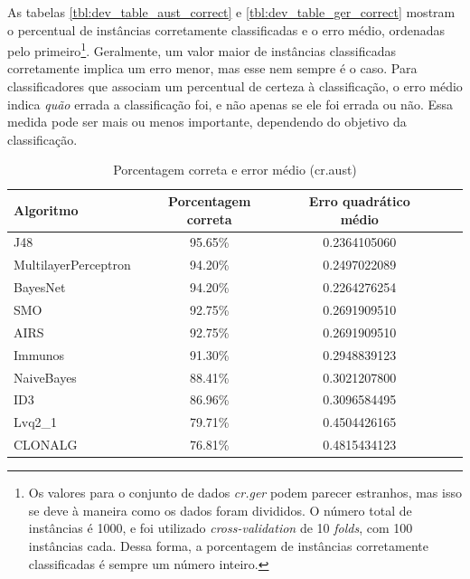 As tabelas \ref{tbl:dev_table_aust_correct} e \ref{tbl:dev_table_ger_correct} mostram o percentual de instâncias corretamente classificadas e o erro médio, ordenadas pelo primeiro\footnote{Os valores para o conjunto de dados \emph{cr.ger} podem parecer estranhos, mas isso se deve à maneira como os dados foram divididos. O número total de instâncias é 1000, e foi utilizado \emph{cross-validation} de 10 \emph{folds}, com 100 instâncias cada. Dessa forma, a porcentagem de instâncias corretamente classificadas é sempre um número inteiro.}. Geralmente, um valor maior de instâncias classificadas corretamente implica um erro menor, mas esse nem sempre é o caso. Para classificadores que associam um percentual de certeza à classificação, o erro médio indica \emph{quão} errada a classificação foi, e não apenas se ele foi errada ou não. Essa medida pode ser mais ou menos importante, dependendo do objetivo da classificação.

\begin{table}[h!]
    \vspace{0.5cm}
    \centering
    \caption{Porcentagem correta e error médio (cr.aust)}
    \label{tbl:dev_table_aust_correct}
    \label{tbl:dev_table_first}
    \vspace{0.5cm}
    \begin{tabular}{|l|c|c|c|c|}
        \hline
        \textbf{Algoritmo} & \textbf{Porcentagem correta} & \textbf{Erro quadrático médio} \\
        \hline
        \rowcolor[gray]{.9}
        J48                  & 95.65\% & 0.2364105060 \\ \hline
        \rowcolor[gray]{.9}
        MultilayerPerceptron & 94.20\% & 0.2497022089 \\ \hline
        \rowcolor[gray]{.9}
        BayesNet             & 94.20\% & 0.2264276254 \\ \hline
        SMO                  & 92.75\% & 0.2691909510 \\ \hline
        AIRS                 & 92.75\% & 0.2691909510 \\ \hline
        Immunos              & 91.30\% & 0.2948839123 \\ \hline
        NaiveBayes           & 88.41\% & 0.3021207800 \\ \hline
        ID3                  & 86.96\% & 0.3096584495 \\ \hline
        Lvq2\_1              & 79.71\% & 0.4504426165 \\ \hline
        CLONALG              & 76.81\% & 0.4815434123 \\ \hline
    \end{tabular}
    \vspace{0.5cm}
\end{table}

